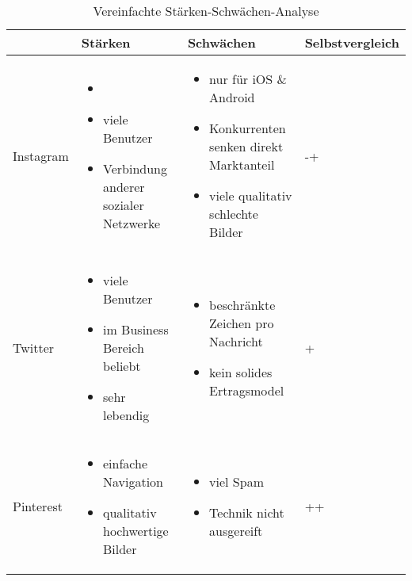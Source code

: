 \begin{center}
	\begin{table}[htbp!]
	\centering
		\begin{tabular}{| M{2cm} | M{5cm} | M{5cm} | M{3cm} |}
		\hline
			\textbf{ } & \textbf{Stärken} & \textbf{Schwächen} & \textbf{Selbstvergleich} \\ \hline
			Instagram 
			& \begin{itemize}
				\item[]
				\item viele Benutzer
				\item Verbindung anderer sozialer Netzwerke
			\end{itemize}
			& \begin{itemize}
				\item nur für iOS \& Android
				\item Konkurrenten senken direkt Marktanteil
				\item viele qualitativ schlechte Bilder
			\end{itemize} 
			& -+
			\\ \hline
			
			Twitter 
			& \begin{itemize}
				\item viele Benutzer
				\item im Business Bereich beliebt
				\item sehr lebendig
			\end{itemize}
			& \begin{itemize}
				\item beschränkte Zeichen pro Nachricht
				\item kein solides Ertragsmodel
			\end{itemize} 
			& +
			\\ \hline
			
			Pinterest 
			& \begin{itemize}
				\item einfache Navigation
				\item qualitativ hochwertige Bilder
			\end{itemize}
			& \begin{itemize}
				\item viel Spam
				\item Technik nicht ausgereift
			\end{itemize} 
			& ++
			\\ \hline
		\end{tabular}
		\caption{Vereinfachte Stärken-Schwächen-Analyse}
		\label{table:simpleSwot}
	\end{table}
\end{center}
